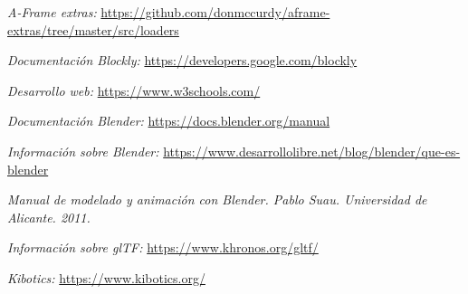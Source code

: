 \begin{thebibliography}{99}
    \textit{A-Frame extras: }
    \url{https://github.com/donmccurdy/aframe-extras/tree/master/src/loaders}
    
    \textit{Documentación Blockly: }
    \url{https://developers.google.com/blockly}
    
    \textit{Desarrollo web: }
    \url{https://www.w3schools.com/}
    
    \textit{Documentación Blender: }
    \url{https://docs.blender.org/manual}
    
    \textit{Información sobre Blender: }
    \url{https://www.desarrollolibre.net/blog/blender/que-es-blender}
    
    \textit{Manual de modelado y animación con Blender. Pablo Suau. Universidad de Alicante. 2011.}
    
    \textit{Información sobre glTF: }
    \url{https://www.khronos.org/gltf/}
   
    \textit{Kibotics:}  
    \url{https://www.kibotics.org/}

\end{thebibliography}